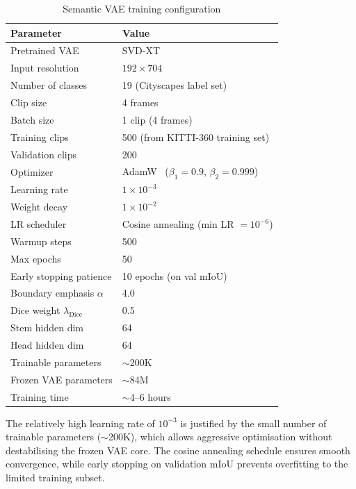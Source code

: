 \begin{table}[t]
    \centering
    \caption{Semantic VAE training configuration}
    \label{tab:vae_config}
    \begin{tabular}{ll}
        \toprule
        \textbf{Parameter} & \textbf{Value} \\
        \midrule
        Pretrained VAE & SVD-XT~\cite{blattmann2023stable} \\
        Input resolution & $192 \times 704$ \\
        Number of classes & 19 (Cityscapes label set) \\
        Clip size & 4 frames \\
        Batch size & 1 clip (4 frames) \\
        Training clips & 500 (from KITTI-360 training set) \\
        Validation clips & 200 \\
        Optimizer & AdamW~\cite{loshchilov2019decoupled} ($\beta_1\!=\!0.9$, $\beta_2\!=\!0.999$) \\
        Learning rate & $1 \times 10^{-3}$ \\
        Weight decay & $1 \times 10^{-2}$ \\
        LR scheduler & Cosine annealing (min LR $= 10^{-6}$) \\
        Warmup steps & 500 \\
        Max epochs & 50 \\
        Early stopping patience & 10 epochs (on val mIoU) \\
        Boundary emphasis $\alpha$ & 4.0 \\
        Dice weight $\lambda_{\text{Dice}}$ & 0.5 \\
        Stem hidden dim & 64 \\
        Head hidden dim & 64 \\
        Trainable parameters & $\sim$200K \\
        Frozen VAE parameters & $\sim$84M \\
        Training time & $\sim$4--6 hours \\
        \bottomrule
    \end{tabular}
\end{table}

The relatively high learning rate of $10^{-3}$ is justified by the small number of trainable parameters ($\sim$200K), which allows aggressive optimisation without destabilising the frozen VAE core. The cosine annealing schedule ensures smooth convergence, while early stopping on validation mIoU prevents overfitting to the limited training subset.

